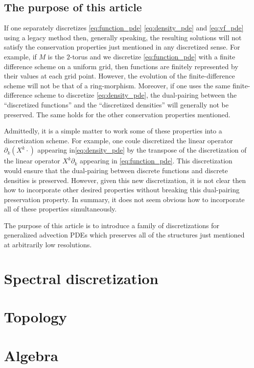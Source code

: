 \documentclass[12pt]{amsart}
\begin{document}
\subsection{The purpose of this article}
\label{sec:purpose}
If one separately discretizes \eqref{eq:function_pde} \eqref{eq:density_pde} and \eqref{eq:vf_pde} using a legacy method
then, generally speaking, the resulting solutions will not satisfy the conservation properties just mentioned in any discretized sense.
For example, if $M$ is the $2$-torus and we discretize \eqref{eq:function_pde} with a finite difference scheme on a uniform grid,
then functions are finitely represented by their values at each grid point.
However, the evolution of the finite-difference scheme will not be that of a ring-morphism.
Moreover, if one uses the same finite-difference scheme to discretize \eqref{eq:density_pde}, the dual-pairing between the 
``discretized functions'' and the ``discretized densities'' will generally not be preserved.
The same holds for the other conservation properties mentioned.

Admittedly, it is a simple matter to work some of these properties into a discretization scheme.
For example, one coule discretized the linear operator  $\partial_k (X^k \cdot )$ appearing in\eqref{eq:density_pde} by the transpose of the
discretization of the linear operator $X^k \partial_k$ appearing in \eqref{eq:function_pde}.
This discretization would ensure that the dual-pairing between discrete functions and discrete densities is preserved.
However, given this new discretization,
it is not clear then how to incorporate other desired properties without breaking this dual-pairing preservation property.
In summary, it does not seem obvious how to incorporate all of these properties simultaneously.

The purpose of this article is to introduce a family of discretizations for generalized advection PDEs
which preserves all of the structures just mentioned at arbitrarily low resolutions.

\section{Spectral discretization}

\section{Topology}

\section{Algebra}
\end{document}
